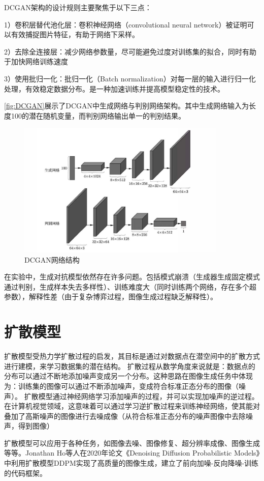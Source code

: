 DCGAN架构的设计规则主要聚焦于以下三点：

1）卷积层替代池化层：卷积神经网络（convolutional neural network）被证明可以有效捕捉图片特征，有助于网络下采样。

2）去除全连接层：减少网络参数量，尽可能避免过度对训练集的拟合，同时有助于加快网络训练速度

3）使用批归一化：批归一化（Batch normalization）对每一层的输入进行归一化处理，有效稳定数据分布。是一种加速训练并提高模型稳定性的技术。

\autoref{fig:DCGAN}展示了DCGAN中生成网络与判别网络架构。其中生成网络输入为长度100的潜在随机变量，而判别网络输出单一的判别结果。
\begin{figure}[!htbp]
    \centering
    \includegraphics[width=10cm]{image/chap02/DCGAN.png}
    \caption{DCGAN网络结构}
    \label{fig:DCGAN}
\end{figure}

在实验中，生成对抗模型依然存在许多问题\cite{zhangtowards}。包括模式崩溃（生成器生成固定模式通过判别，生成样本失去多样性）、训练难度大（同时训练两个网络，存在多个超参数），解释性差（由于复杂博弈过程，图像生成过程缺乏解释性）。

\section{扩散模型}
扩散模型受热力学扩散过程的启发\cite{sohl2015deep}，其目标是通过对数据点在潜空间中的扩散方式进行建模，来学习数据集的潜在结构。
扩散过程从数学角度来说就是：数据点的分布可以通过不断地添加噪声变成另一个分布。这种思路在图像生成任务中体现为：训练集的图像可以通过不断添加噪声，变成符合标准正态分布的图像（噪声）。
扩散模型通过神经网络学习添加噪声的过程，并可以实现加噪声的逆过程。在计算机视觉领域，这意味着可以通过学习逆扩散过程来训练神经网络，使其能对叠加了高斯噪声的图像进行去噪成像（从符合标准正态分布的噪声图像中去除噪声，得到图像）

扩散模型可以应用于各种任务，如图像去噪、图像修复、超分辨率成像、图像生成等等。Jonathan Ho等人在2020年论文《Denoising Diffusion Probabilistic Models》\cite{ho2020denoising}中利用扩散模型DDPM实现了高质量的图像生成，建立了前向加噪-反向降噪-训练的代码框架。

